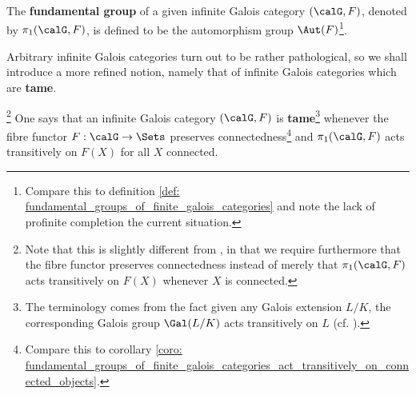             \begin{definition} \label{def: fundamental_groups_of_infinite_galois_categories}
                The \textbf{fundamental group} of a given infinite Galois category $(\calG, F)$, denoted by $\pi_1(\calG, F)$, is defined to be the automorphism group $\Aut(F)$\footnote{Compare this to definition \ref{def: fundamental_groups_of_finite_galois_categories} and note the lack of profinite completion the current situation.}.
            \end{definition}
            Arbitrary infinite Galois categories turn out to be rather pathological, so we shall introduce a more refined notion, namely that of infinite Galois categories which are \textbf{tame}.  
            \begin{definition} \label{def: tame_infinite_galois_categories}
                \footnote{Note that this is slightly different from \cite[Definition 7.2.4]{bhatt_scholze_2014_pro_etale}, in that we require furthermore that the fibre functor preserves connectedness instead of merely that $\pi_1(\calG, F)$ acts transitively on $F(X)$ whenever $X$ is connected.} One says that an infinite Galois category $(\calG, F)$ is \textbf{tame}\footnote{The terminology comes from the fact given any Galois extension $L/K$, the corresponding Galois group $\Gal(L/K)$ acts transitively on $L$ (cf. \cite[Proposition I.9.1]{neukirch_2010_algebraic_number_theory}).} whenever the fibre functor $F: \calG \to \Sets$ preserves connectedness\footnote{Compare this to corollary \ref{coro: fundamental_groups_of_finite_galois_categories_act_transitively_on_connected_objects}.} and $\pi_1(\calG, F)$ acts transitively on $F(X)$ for all $X$ connected.
            \end{definition}
            
